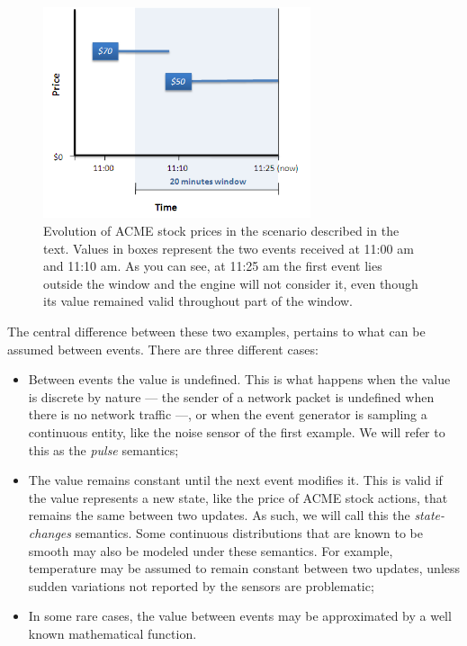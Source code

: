 \documentclass[a4,11pt]{report}
\begin{document}
\begin{figure}[htbp]
  \center
  \includegraphics[width=0.7\textwidth]{outside-window.png}
  \caption{Evolution of ACME stock prices in the scenario described in
    the text. Values in boxes represent the two events received at
    11:00 am and 11:10 am. As you can see, at 11:25 am the first event
    lies outside the window and the engine will not consider it, even
    though its value remained valid throughout part of the window.}
  \label{fig:outside-window}
\end{figure}


The central difference between these two examples, pertains to what
can be assumed between events. There are three different cases:

\begin{itemize}
\item Between events the value is undefined. This is what happens when
  the value is discrete by nature --- the sender of a network packet
  is undefined when there is no network traffic ---, or when the event
  generator is sampling a continuous entity, like the noise sensor of
  the first example. We will refer to this as the \emph{pulse}
  semantics;
\item The value remains constant until the next event modifies
  it. This is valid if the value represents a new state, like the
  price of ACME stock actions, that remains the same between two
  updates. As such, we will call this the \emph{state-changes}
  semantics. Some continuous distributions that are known to be smooth
  may also be modeled under these semantics. For example, temperature
  may be assumed to remain constant between two updates, unless sudden
  variations not reported by the sensors are problematic;
\item In some rare cases, the value between events may be approximated
  by a well known mathematical function.
\end{itemize}
\end{document}
